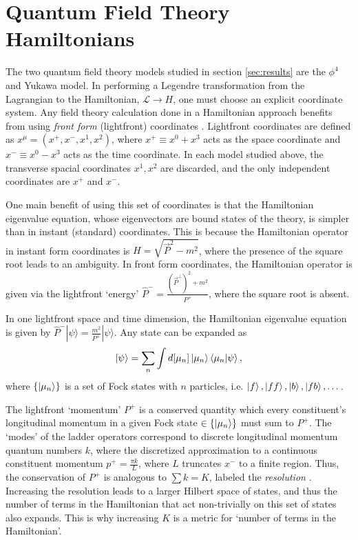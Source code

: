 \section{Quantum Field Theory Hamiltonians}
\label{subsec:qft-hamiltonians}

The two quantum field theory models studied in section \ref{sec:results} are the $\phi^4$ and Yukawa model.
In performing a Legendre transformation from the Lagrangian to the Hamiltonian, $\mathcal{L} \rightarrow H$, one must choose an explicit coordinate system.
Any field theory calculation done in a Hamiltonian approach benefits from using \textit{front form} (lightfront) coordinates \cite{Dirac1949}.
Lightfront coordinates are defined as $x^\mu = \left(x^+, x^-, x^1, x^2 \right)$, where $x^+ \equiv x^0 + x^3$ acts as the space coordinate and $x^- \equiv x^0 - x^3$ acts as the time coordinate.
In each model studied above, the transverse spacial coordinates $x^1, x^2$ are discarded, and the only independent coordinates are $x^+$ and $x^-$.

One main benefit of using this set of coordinates is that the Hamiltonian eigenvalue equation, whose eigenvectors are bound states of the theory, is simpler than in instant (standard) coordinates.
This is because the Hamiltonian operator in instant form coordinates is $H = \sqrt{\vec{P}^2 - m^2}$, where the presence of the square root leads to an ambiguity.
In front form coordinates, the Hamiltonian operator is given via the lightfront `energy' $\hat P^- = \frac{\left(\vec{P}^\perp\right)^2 + m^2}{P^+}$, where the square root is absent.

In one lightfront space and time dimension, the Hamiltonian eigenvalue equation is given by $\hat P^-|\psi\rangle = \frac{m^2}{P^+}|\psi\rangle$.
Any state can be expanded as $$\ket{\psi} = \sum_n \int d[\mu_n] \ket{\mu_n}\braket{\mu_n}{\psi},$$ where $\{\ket{\mu_n}\}$ is a set of Fock states with $n$ particles, i.e. $\ket{f}, \ket{ff}, \ket{b}, \ket{fb}, \dots$.

The lightfront `momentum' $P^+$ is a conserved quantity which every constituent's longitudinal momentum in a given Fock state $\in \{\ket{\mu_n}\}$ must sum to $P^+$.
The `modes' of the ladder operators correspond to discrete longitudinal momentum quantum numbers $k$, where the discretized approximation to a continuous constituent momentum $p^+ = \frac{\pi k}{L}$, where $L$ truncates $x^-$ to a finite region.
Thus, the conservation of $P^+$ is analogous to $\sum k = K$, labeled the \textit{resolution} \cite{}.
Increasing the resolution leads to a larger Hilbert space of states, and thus the number of terms in the Hamiltonian that act non-trivially on this set of states also expands.
This is why increasing $K$ is a metric for `number of terms in the Hamiltonian'.


